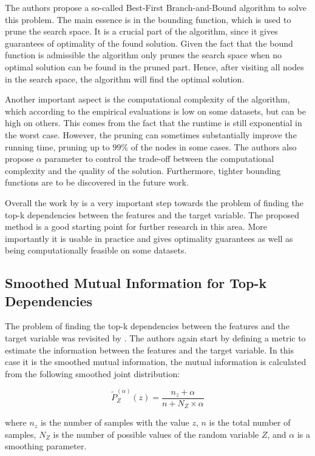 \documentclass{article}
\begin{document}
The authors propose a so-called Best-First Branch-and-Bound algorithm to solve this problem. The main essence is in the 
bounding function, which is used to prune the search space. It is a crucial part of the algorithm, since it gives guarantees of optimality of the found solution. Given the fact that the bound function is admissible the algorithm only prunes the search space when no optimal solution can be found in the pruned part. Hence, after visiting all nodes in the search space, the algorithm will find the optimal solution.

Another important aspect is the computational complexity of the algorithm, which according to the empirical evaluations is low on some datasets, but can be high on others. This comes from the fact that the runtime is still exponential in the worst case. However, the pruning can sometimes substantially improve the running time, pruning up to $99\%$ of the nodes in some cases. The authors also propose $\alpha$ parameter to control the trade-off between the computational complexity and the quality of the solution. Furthermore, tighter bounding functions are to be discovered in the future work. 

Overall the work by \cite{mandros2017} is a very important step towards the problem of finding the top-k dependencies between the features and the target variable. The proposed method is a good starting point for further research in this area. More importantly it is usable in practice and gives optimality guarantees as well as being computationally feasible on some datasets.

\subsection{Smoothed Mutual Information for Top-k Dependencies}
The problem of finding the top-k dependencies between the features and the target variable was revisited by \cite{pennerath2020}. The authors again start by defining a metric to estimate the information between the features and the target variable. In this case it is the smoothed mutual information, the mutual information is calculated from the following smoothed joint distribution:

\begin{equation}
    \tilde{P}^{(\alpha)}_Z(z) = \frac{n_z + \alpha}{n + N_Z \times \alpha}
\end{equation}

where $n_z$ is the number of samples with the value $z$, $n$ is the total number of samples, $N_Z$ is the number of possible values of the random variable $Z$, and $\alpha$ is a smoothing parameter. 
\end{document}
